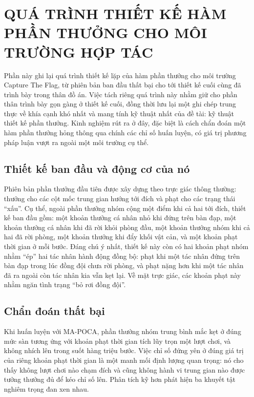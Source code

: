 \fontsize{13pt}{22.5pt}\selectfont


\section{QUÁ TRÌNH THIẾT KẾ HÀM PHẦN THƯỞNG CHO MÔI TRƯỜNG HỢP TÁC}
\label{ap:reward-process}

\indent Phần này ghi lại quá trình thiết kế lặp của hàm phần thưởng cho môi trường
Capture The Flag, từ phiên bản ban đầu thất bại cho tới thiết kế cuối cùng đã trình
bày trong thân đồ án. Việc tách riêng quá trình này nhằm giữ cho phần thân trình bày
gọn gàng ở thiết kế cuối, đồng thời lưu lại một ghi chép trung thực về khía cạnh khó
nhất và mang tính kỹ thuật nhất của đề tài: kỹ thuật thiết kế phần thưởng. Kinh nghiệm
rút ra ở đây, đặc biệt là cách chẩn đoán một hàm phần thưởng hỏng thông qua chính các
chỉ số huấn luyện, có giá trị phương pháp luận vượt ra ngoài một môi trường cụ thể.

\subsection{Thiết kế ban đầu và động cơ của nó}
\indent Phiên bản phần thưởng đầu tiên được xây dựng theo trực giác thông thường: thưởng
cho các cột mốc trung gian hướng tới đích và phạt cho các trạng thái ``xấu''. Cụ thể,
ngoài phần thưởng nhóm cộng một điểm khi cả hai tới đích, thiết kế ban đầu gồm: một
khoản thưởng cá nhân nhỏ khi đứng trên bàn đạp, một khoản thưởng cá nhân khi đã rời khỏi
phòng đầu, một khoản thưởng nhóm khi cả hai đã rời phòng, một khoản thưởng khi đẩy khối
vật cản, và một khoản phạt thời gian ở mỗi bước. Đáng chú ý nhất, thiết kế này còn có
hai khoản phạt nhóm nhằm ``ép'' hai tác nhân hành động đồng bộ: phạt khi một tác
nhân đứng trên bàn đạp trong lúc đồng đội chưa rời phòng, và phạt nặng hơn khi một tác
nhân đã ra ngoài còn tác nhân kia vẫn kẹt lại. Về mặt trực giác, các khoản phạt này
nhằm ngăn tình trạng ``bỏ rơi đồng đội''.

\subsection{Chẩn đoán thất bại}
\indent Khi huấn luyện với MA-POCA, phần thưởng nhóm trung bình mắc kẹt ở đúng mức sàn
tương ứng với khoản phạt thời gian tích lũy trọn một lượt chơi, và không nhích lên trong
suốt hàng triệu bước. Việc chỉ số đứng yên ở đúng giá trị của riêng khoản phạt thời gian
là một manh mối định lượng quan trọng: nó cho thấy không lượt chơi nào chạm đích và cũng
không hành vi trung gian nào được tưởng thưởng đủ để kéo chỉ số lên. Phân tích kỹ hơn
phát hiện ba khuyết tật nghiêm trọng đan xen nhau.

